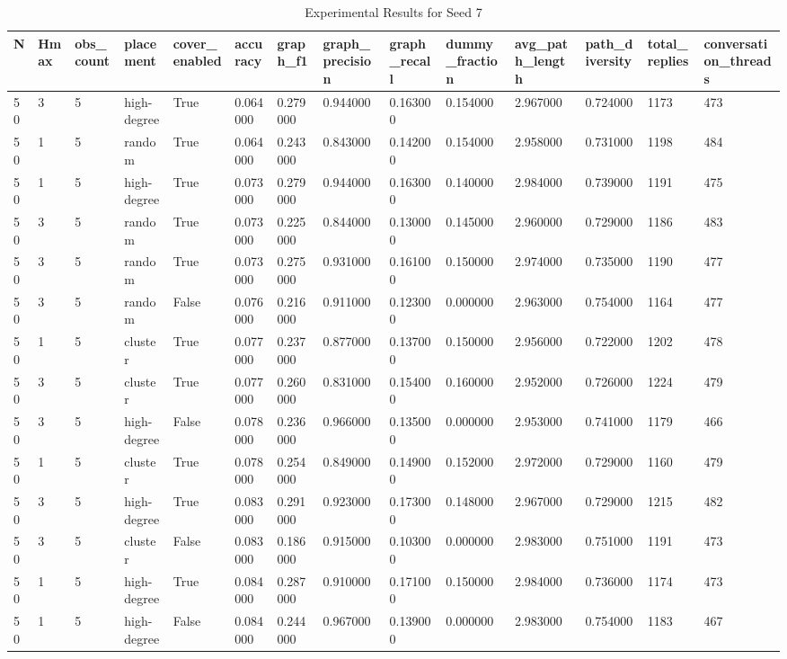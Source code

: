 \begin{table}
\caption{Experimental Results for Seed 7}
\label{tab:results_seed_7}
\begin{tabular}{llllllllllllll}
\toprule
N & Hmax & obs_count & placement & cover_enabled & accuracy & graph_f1 & graph_precision & graph_recall & dummy_fraction & avg_path_length & path_diversity & total_replies & conversation_threads \\
\midrule
50 & 3 & 5 & high-degree & True & 0.064000 & 0.279000 & 0.944000 & 0.163000 & 0.154000 & 2.967000 & 0.724000 & 1173 & 473 \\
50 & 1 & 5 & random & True & 0.064000 & 0.243000 & 0.843000 & 0.142000 & 0.154000 & 2.958000 & 0.731000 & 1198 & 484 \\
50 & 1 & 5 & high-degree & True & 0.073000 & 0.279000 & 0.944000 & 0.163000 & 0.140000 & 2.984000 & 0.739000 & 1191 & 475 \\
50 & 3 & 5 & random & True & 0.073000 & 0.225000 & 0.844000 & 0.130000 & 0.145000 & 2.960000 & 0.729000 & 1186 & 483 \\
50 & 3 & 5 & random & True & 0.073000 & 0.275000 & 0.931000 & 0.161000 & 0.150000 & 2.974000 & 0.735000 & 1190 & 477 \\
50 & 3 & 5 & random & False & 0.076000 & 0.216000 & 0.911000 & 0.123000 & 0.000000 & 2.963000 & 0.754000 & 1164 & 477 \\
50 & 1 & 5 & cluster & True & 0.077000 & 0.237000 & 0.877000 & 0.137000 & 0.150000 & 2.956000 & 0.722000 & 1202 & 478 \\
50 & 3 & 5 & cluster & True & 0.077000 & 0.260000 & 0.831000 & 0.154000 & 0.160000 & 2.952000 & 0.726000 & 1224 & 479 \\
50 & 3 & 5 & high-degree & False & 0.078000 & 0.236000 & 0.966000 & 0.135000 & 0.000000 & 2.953000 & 0.741000 & 1179 & 466 \\
50 & 1 & 5 & cluster & True & 0.078000 & 0.254000 & 0.849000 & 0.149000 & 0.152000 & 2.972000 & 0.729000 & 1160 & 479 \\
50 & 3 & 5 & high-degree & True & 0.083000 & 0.291000 & 0.923000 & 0.173000 & 0.148000 & 2.967000 & 0.729000 & 1215 & 482 \\
50 & 3 & 5 & cluster & False & 0.083000 & 0.186000 & 0.915000 & 0.103000 & 0.000000 & 2.983000 & 0.751000 & 1191 & 473 \\
50 & 1 & 5 & high-degree & True & 0.084000 & 0.287000 & 0.910000 & 0.171000 & 0.150000 & 2.984000 & 0.736000 & 1174 & 473 \\
50 & 1 & 5 & high-degree & False & 0.084000 & 0.244000 & 0.967000 & 0.139000 & 0.000000 & 2.983000 & 0.754000 & 1183 & 467 \\

\end{tabular}
\end{table}

